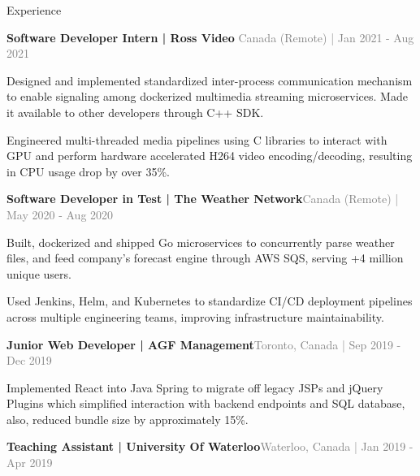 \documentclass[hidelinks]{resume} %
\begin{document}
\begin{rSection}{Experience}
\begin{rSubsection}{\textbf{Software Developer Intern | Ross Video} }{\textcolor{gray}{\small Canada (Remote) | Jan 2021 - Aug 2021}}{}
    \begin{bulletpoints}
        \vspace{-.10cm}
        \item Designed and implemented standardized inter-process communication mechanism to enable signaling among dockerized multimedia streaming microservices. Made it available to other developers through C++ SDK.
        \vspace{-.13cm}
        \item Engineered multi-threaded media pipelines using C libraries to interact with GPU and perform hardware accelerated H264 video encoding/decoding, resulting in CPU usage drop by over 35\%.
        \vspace{-.10cm}
    \end{bulletpoints}
\end{rSubsection}
\begin{rSubsection}{\textbf{Software Developer in Test | The Weather Network}}{\textcolor{gray}{\small Canada (Remote) | May 2020 - Aug 2020}}{}

        \begin{bulletpoints}
            \vspace{-.10cm}
            \item Built, dockerized and shipped Go microservices to concurrently parse weather files, and feed company's forecast engine through AWS SQS, serving +4 million unique users.
            \vspace{-.13cm}
             \item Used Jenkins, Helm, and Kubernetes to standardize CI/CD deployment pipelines across multiple engineering teams, improving infrastructure maintainability.
             \vspace{-.10cm}
        \end{bulletpoints}
\end{rSubsection}
\begin{rSubsection}{\textbf{Junior Web Developer | AGF Management}}{\textcolor{gray}{\small Toronto, Canada | Sep 2019 - Dec 2019}}{}
        \par
        \begin{bulletpoints}
            \vspace{-.10cm}
            \item Implemented React into Java Spring to migrate off legacy JSPs and jQuery Plugins which simplified interaction with backend endpoints and SQL database, also, reduced bundle size by approximately 15\%.
             \vspace{-.10cm}
        \end{bulletpoints}
\end{rSubsection}
\begin{rSubsection}{\textbf{Teaching Assistant | University Of Waterloo}}{\textcolor{gray}{\small Waterloo, Canada | Jan 2019 - Apr 2019}}{}


\end{rSubsection}
\end{rSection}
\end{document}
